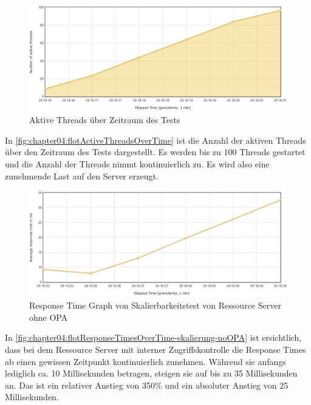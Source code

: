 \begin{figure}[htbp]
  \centering
  \includegraphics[width=1.0\textwidth]{gfx/flotActiveThreadsOverTime.png}
  \caption{Aktive Threads über Zeitraum des Tests}
  \label{fig:chapter04:flotActiveThreadsOverTime}
\end{figure}

In \autoref{fig:chapter04:flotActiveThreadsOverTime} ist die Anzahl der aktiven Threads über den Zeitraum des Tests dargestellt. Es werden bis zu 100 Threads gestartet und die Anzahl der Threads nimmt kontinuierlich zu. Es wird also eine zunehmende Last auf den Server erzeugt. 

\begin{figure}[htbp]
  \centering
  \includegraphics[width=1.0\textwidth]{gfx/flotResponseTimesOverTime-skalierung-noOPA.png}
  \caption{Response Time Graph von Skalierbarkeitstest von Ressource Server ohne OPA}
  \label{fig:chapter04:flotResponseTimesOverTime-skalierung-noOPA}
\end{figure}

In \autoref{fig:chapter04:flotResponseTimesOverTime-skalierung-noOPA} ist ersichtlich, dass bei dem Ressource Server mit interner Zugriffskontrolle die Response Times ab einen gewissen Zeitpunkt kontinuierlich zunehmen. Während sie anfangs lediglich ca. 10 Millisekunden betragen, steigen sie auf bis zu 35 Millisekunden an. Das ist ein relativer Anstieg von 350\% und ein absoluter Anstieg von 25 Millisekunden. 

